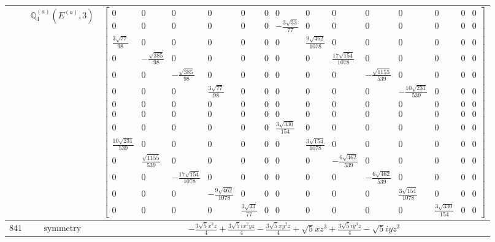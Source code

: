 \documentclass[fleqn,8pt,landscape]{jsarticle}
\begin{document}
\begin{longtable}{ccc}
$  $ & $ \mathbb{Q}_{4}^{(a)}(E^{(a)},3) $ & $ \begin{bmatrix} 0 & 0 & 0 & 0 & 0 & 0 & 0 & 0 & 0 & 0 & 0 & 0 & 0 & 0 \\ 0 & 0 & 0 & 0 & 0 & 0 & - \frac{3 \sqrt{33}}{77} & 0 & 0 & 0 & 0 & 0 & 0 & 0 \\ \frac{3 \sqrt{77}}{98} & 0 & 0 & 0 & 0 & 0 & 0 & \frac{9 \sqrt{462}}{1078} & 0 & 0 & 0 & 0 & 0 & 0 \\ 0 & - \frac{\sqrt{385}}{98} & 0 & 0 & 0 & 0 & 0 & 0 & \frac{17 \sqrt{154}}{1078} & 0 & 0 & 0 & 0 & 0 \\ 0 & 0 & - \frac{\sqrt{385}}{98} & 0 & 0 & 0 & 0 & 0 & 0 & - \frac{\sqrt{1155}}{539} & 0 & 0 & 0 & 0 \\ 0 & 0 & 0 & \frac{3 \sqrt{77}}{98} & 0 & 0 & 0 & 0 & 0 & 0 & - \frac{10 \sqrt{231}}{539} & 0 & 0 & 0 \\ 0 & 0 & 0 & 0 & 0 & 0 & 0 & 0 & 0 & 0 & 0 & 0 & 0 & 0 \\ 0 & 0 & 0 & 0 & 0 & 0 & 0 & 0 & 0 & 0 & 0 & 0 & 0 & 0 \\ 0 & 0 & 0 & 0 & 0 & 0 & \frac{3 \sqrt{330}}{154} & 0 & 0 & 0 & 0 & 0 & 0 & 0 \\ \frac{10 \sqrt{231}}{539} & 0 & 0 & 0 & 0 & 0 & 0 & \frac{3 \sqrt{154}}{1078} & 0 & 0 & 0 & 0 & 0 & 0 \\ 0 & \frac{\sqrt{1155}}{539} & 0 & 0 & 0 & 0 & 0 & 0 & - \frac{6 \sqrt{462}}{539} & 0 & 0 & 0 & 0 & 0 \\ 0 & 0 & - \frac{17 \sqrt{154}}{1078} & 0 & 0 & 0 & 0 & 0 & 0 & - \frac{6 \sqrt{462}}{539} & 0 & 0 & 0 & 0 \\ 0 & 0 & 0 & - \frac{9 \sqrt{462}}{1078} & 0 & 0 & 0 & 0 & 0 & 0 & \frac{3 \sqrt{154}}{1078} & 0 & 0 & 0 \\ 0 & 0 & 0 & 0 & \frac{3 \sqrt{33}}{77} & 0 & 0 & 0 & 0 & 0 & 0 & \frac{3 \sqrt{330}}{154} & 0 & 0 \end{bmatrix} $ \\ \hline
$ 841 $ & $ \text{symmetry} $ & $ - \frac{3 \sqrt{5} x^{3} z}{4} + \frac{3 \sqrt{5} i x^{2} y z}{4} - \frac{3 \sqrt{5} x y^{2} z}{4} + \sqrt{5} x z^{3} + \frac{3 \sqrt{5} i y^{3} z}{4} - \sqrt{5} i y z^{3} $ \\

\end{longtable}
\end{document}
